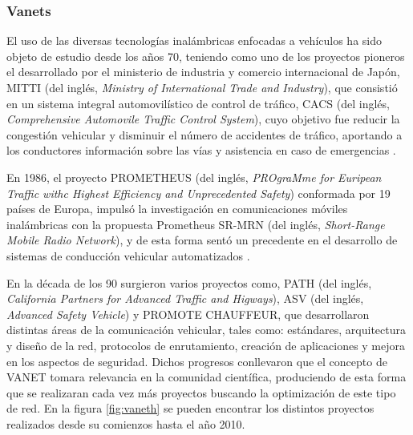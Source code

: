 \subsubsection{Vanets}
El uso de las diversas tecnologías inalámbricas enfocadas a vehículos ha sido objeto de estudio desde los años 70, teniendo como uno de los proyectos pioneros el desarrollado por el ministerio de industria y comercio internacional de Japón, MITTI (del inglés, \textit{Ministry of International Trade and Industry}), que consistió en un sistema integral automovilístico de control de tráfico, CACS (del inglés, \textit{Comprehensive Automovile Traffic Control System}), cuyo objetivo fue reducir la congestión vehicular y disminuir el número de accidentes de tráfico, aportando a los conductores información sobre las vías y asistencia en caso de emergencias \cite{orozco2012redes}.\\

\par En 1986, el proyecto PROMETHEUS (del inglés, \textit{PROgraMme for Euripean Traffic withc Highest Efficiency and Unprecedented Safety}) conformada por 19 países de Europa, impulsó la investigación en comunicaciones móviles inalámbricas con la propuesta Prometheus SR-MRN (del inglés, \textit{Short-Range Mobile Radio Network}), y de esta forma sentó un precedente en el desarrollo de sistemas de conducción vehicular automatizados \cite{heistert}.\\

\par En la década de los 90 \cite{zeadally2012vehicular} surgieron varios proyectos como, PATH (del inglés, \textit{California Partners for Advanced Traffic and Higways}), ASV (del inglés, \textit{Advanced Safety Vehicle}) y PROMOTE CHAUFFEUR, que desarrollaron distintas áreas de la comunicación vehicular, tales como: estándares, arquitectura y diseño de la red, protocolos de enrutamiento, creación de aplicaciones y mejora en los aspectos de seguridad. Dichos progresos conllevaron que el concepto de VANET tomara relevancia en la comunidad científica,  produciendo de esta forma que se realizaran cada vez más proyectos buscando la optimización de este tipo de red. En la figura \ref{fig:vaneth} se pueden encontrar los distintos proyectos realizados desde su comienzos hasta el año 2010.\\

